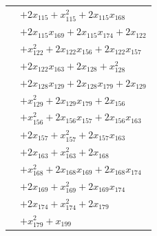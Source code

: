 \begin{longtable}{@{}r@{\;}l@{}}
 & \(\displaystyle +2x_{115} +x_{115}^{2} +2x_{115}x_{168}\) \\
 & \(\displaystyle +2x_{115}x_{169} +2x_{115}x_{174} +2x_{122}\) \\
 & \(\displaystyle +x_{122}^{2} +2x_{122}x_{156} +2x_{122}x_{157}\) \\
 & \(\displaystyle +2x_{122}x_{163} +2x_{128} +x_{128}^{2}\) \\
 & \(\displaystyle +2x_{128}x_{129} +2x_{128}x_{179} +2x_{129}\) \\
 & \(\displaystyle +x_{129}^{2} +2x_{129}x_{179} +2x_{156}\) \\
 & \(\displaystyle +x_{156}^{2} +2x_{156}x_{157} +2x_{156}x_{163}\) \\
 & \(\displaystyle +2x_{157} +x_{157}^{2} +2x_{157}x_{163}\) \\
 & \(\displaystyle +2x_{163} +x_{163}^{2} +2x_{168}\) \\
 & \(\displaystyle +x_{168}^{2} +2x_{168}x_{169} +2x_{168}x_{174}\) \\
 & \(\displaystyle +2x_{169} +x_{169}^{2} +2x_{169}x_{174}\) \\
 & \(\displaystyle +2x_{174} +x_{174}^{2} +2x_{179}\) \\
 & \(\displaystyle +x_{179}^{2} +x_{199}\) \\[3pt]
\end{longtable}
\endgroup
